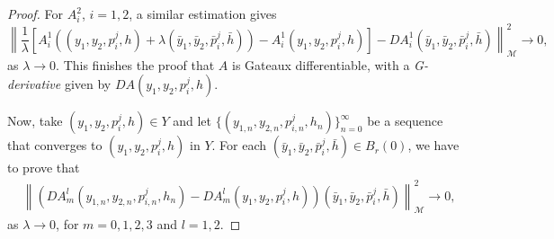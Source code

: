 \documentclass[11pt,a4paper]{amsart}
\numberwithin{equation}{section}
\begin{document}
\begin{proof}
    For $A^2_i$, $i=1,2$, a similar estimation gives
    $$
        \left\| \frac{1}{\lambda}\left[ A^1_i (( y_1, y_2, p_i^j, h)+\lambda(\bar y_1,\bar y_2,\bar p_i^j,\bar h)) - A^1_i( y_1, y_2, p_i^j, h) \right] - D A^1_i(\bar y_1,\bar y_2,\bar p_i^j,\bar h) \right\|^{2}_{\mathcal{M}} \to 0,
    $$
    as $\lambda \to 0$. This finishes the proof that $A$ is Gateaux differentiable, with a \textit{G-derivative} given by $D A( y_1, y_2, p_i^j, h)$.
    
     Now, take $( y_1, y_2, p_i^j, h)\in Y$ and let $\{(y_{1,n},y_{2,n},p^{j}_{i,n},h_{n})\}_{n=0}^{\infty}$ be a sequence that converges to  $( y_1, y_2, p_i^j, h)$ in $Y$. For each $(\bar y_1,\bar y_2,\bar p_i^j,\bar h)\in B_{r}(0)$, we have to prove that 
    \begin{equation}\label{eq:continuity_DA_m_l}
    	\begin{split}
    		&\left\|(D A^l_m(y_{1,n},y_{2,n},p^{j}_{i,n},h_{n})-D A^l_m( y_1, y_2, p_i^j, h))(\bar y_1,\bar y_2,\bar p_i^j,\bar h) \right\|^{2}_{\mathcal{M}}\rightarrow 0,
    	\end{split}
    \end{equation}
    as $\lambda \to 0$, for $m=0,1,2,3$ and $l=1,2$.
    

\end{proof}
\end{document}
